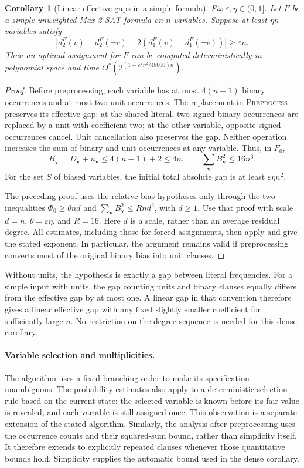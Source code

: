 \documentclass[11pt,a4paper]{article}
\newtheorem{corollary}[theorem]{Corollary}
\theoremstyle{definition}
\theoremstyle{remark}
\newcommand{\Ostar}{O^{*}}
\begin{document}
\begin{corollary}[Linear effective gaps in a simple formula]\label{cor:lineargap}
Fix $\varepsilon,\eta\in(0,1]$. Let $F$ be a simple unweighted Max 2-SAT
formula on $n$ variables. Suppose at least $\eta n$ variables satisfy
\[
 |d_2^F(v)-d_2^F(\neg v)+2(d_1^F(v)-d_1^F(\neg v))|
 \ge\varepsilon n.
\]
Then an optimal assignment for $F$ can be computed deterministically in
polynomial space and time
$\Ostar(2^{(1-\varepsilon^2\eta^2/48000)n})$.
\end{corollary}
\begin{proof}
Before preprocessing, each variable has at most $4(n-1)$ binary occurrences
and at most two unit occurrences. The replacement in \textnormal{\textsc{Preprocess}}
preserves its effective gap: at the shared literal, two signed binary
occurrences are replaced by a unit with coefficient two; at the other
variable, opposite signed occurrences cancel. Unit cancellation also
preserves the gap. Neither operation increases the sum of binary and unit
occurrences at any variable. Thus, in $F_0$,
\[
 B_{\mathbf v}=D_{\mathbf v}+u_{\mathbf v}\le4(n-1)+2\le4n,
 \qquad \sum_{\mathbf v}B_{\mathbf v}^2\le16n^3.
\]
For the set $S$ of biased variables, the initial total absolute gap is at
least $\varepsilon\eta n^2$.

The preceding proof uses the relative-bias hypotheses only through the
two inequalities $\Phi_0\ge\theta nd$ and
$\sum_{\mathbf v}B_{\mathbf v}^2\le Rnd^2$, with $d\ge1$.
Use that proof with scale $d=n$, $\theta=\varepsilon\eta$, and $R=16$.
Here $d$ is a scale, rather than an average residual degree.
All estimates, including those for forced assignments, then apply and give
the stated exponent. In particular, the argument remains valid if
preprocessing converts most of the original binary bias into unit clauses.
\end{proof}

Without units, the hypothesis is exactly a gap between literal frequencies.
For a simple input with units, the gap counting units and binary clauses
equally differs from the effective gap by at most one. A linear gap in
that convention therefore gives a linear effective gap with any fixed
slightly smaller coefficient for sufficiently large $n$.
No restriction on the degree sequence is needed for this dense corollary.

\paragraph{Variable selection and multiplicities.}
The algorithm uses a fixed branching order to make its specification
unambiguous. The probability estimates also apply to a deterministic
selection rule based on the current state: the selected variable is known
before its fair value is revealed, and each variable is still assigned
once. This observation is a separate extension of the stated algorithm.
Similarly, the analysis after preprocessing uses the occurrence counts and
their squared-sum bound, rather than simplicity itself. It therefore
extends to explicitly repeated clauses whenever those quantitative bounds
hold. Simplicity supplies the automatic bound used in the dense corollary.
\end{document}
